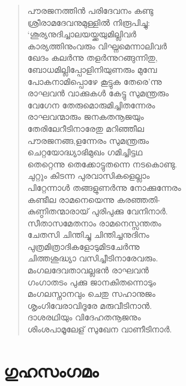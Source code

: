 \begin{verse}
പൗരജനത്തിന്‍ പരിദേവനം കണ്ടു\\
ശ്രീരാമദേവനുമുള്ളില്‍ നിരൂപിച്ചു:\\
‘ശൂര്യനുദിച്ചാലയയ്ക്കയുമില്ലിവര്‍\\
കാര്യത്തിനുംവരും വിഘ്നമെന്നാലിവര്‍\\
ഖേദം കലര്‍ന്നു തളര്‍ന്നുറങ്ങുന്നിതു,\\
ബോധമില്ലിപ്പോളിനിയുണരും മുമ്പേ\\
പോകനാമിപ്പൊഴേ കൂട്ടുക തേരെ’ന്നു\\
രാഘവന്‍ വാക്കുകള്‍ കേട്ടു സുമന്ത്രരും\\
വേഗേന തേരുമൊരുമിച്ചിതന്നേരം\\
രാഘവന്മാരും ജനകതനൂജയും\\
തേരിലേറീടിനാരേതു മറിഞ്ഞീല\\
പൗരജനങ്ങ,ളന്നേരം സുമന്ത്രരും\\
ചെറ്റയോദ്ധ്യാഭിമുഖം ഗമിച്ചിട്ടഥ\\
തെറ്റെന്നു തെക്കോട്ടുതന്നെ നടകൊണ്ടു.\\
ചുറ്റും കിടന്ന പുരവാസികളെല്ലാം\\
പിറ്റേന്നാള്‍ തങ്ങളുണര്‍ന്നു നോക്കുന്നേരം\\
കണ്ടീല രാമനെയെന്നു കരഞ്ഞതി-\\
കുണ്ഠിതന്മാരായ് പുരിപുക്കു വേനിനാര്‍.\\
സീതാസമേതനാം രാമനെസ്സന്തതം\\
ചേതസി ചിന്തിച്ചു ചിന്തിച്ചനുദിനം\\
പുത്രമിത്രാദികളോടുമിടചേര്‍ന്നു\\
ചിത്തശുദ്ധ്യാ വസിച്ചീടിനാരേവരും.\\
മംഗലദേവതാവല്ലഭന്‍ രാഘവന്‍\\
ഗംഗാതടം പുക്കു ജാനകിതന്നൊടും\\
മംഗലസ്നാനവും ചെതു സഹാനുജം\\
ശൃംഗിവേരാവിദൂരേ മരുവീടിനാന്‍.\\
ദാശരഥിയും വിദേഹതനൂജനും\\
ശിംശപാമൂലേള് സുഖേന വാണീടിനാര്‍.
\end{verse}


\section{ഗുഹസംഗമം}

